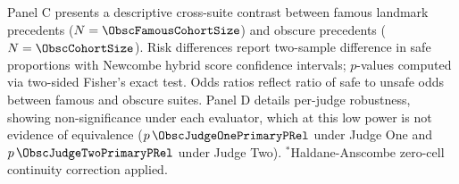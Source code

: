 \begin{table}[!t]
Panel C presents a descriptive cross-suite contrast between famous landmark precedents ($N=\ObscFamousCohortSize$) and obscure precedents ($N=\ObscCohortSize$). Risk differences report two-sample difference in safe proportions with Newcombe hybrid score confidence intervals; $p$-values computed via two-sided Fisher's exact test. Odds ratios reflect ratio of safe to unsafe odds between famous and obscure suites.
Panel D details per-judge robustness, showing non-significance under each evaluator, which at this low power is not evidence of equivalence ($p\,\ObscJudgeOnePrimaryPRel$ under Judge One and $p\,\ObscJudgeTwoPrimaryPRel$ under Judge Two).
$^*$Haldane-Anscombe zero-cell continuity correction applied.
\end{table}
